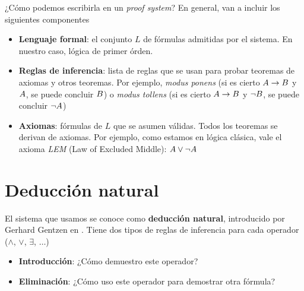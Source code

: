 ¿Cómo podemos escribirla en un \textit{proof system}? En general, van a incluir
los siguientes componentes

\begin{itemize}
    \item \textbf{Lenguaje formal}: el conjunto $L$ de fórmulas admitidas por
    el sistema. En nuestro caso, lógica de primer órden.
    \item \textbf{Reglas de inferencia}: lista de reglas que se usan para probar
    teoremas de axiomas y otros teoremas. Por ejemplo, \textit{modus ponens} (si
    es cierto $A \rightarrow B$ y $A$, se puede concluir $B$) o
    \textit{modus tollens} (si es cierto $A \rightarrow B$ y $\neg
    B$, se puede concluir $\neg A$)
    \item \textbf{Axiomas}: fórmulas de $L$ que se asumen válidas. Todos los
    teoremas se derivan de axiomas. Por ejemplo, como estamos en lógica clásica,
    vale el axioma \textit{LEM} (Law of Excluded Middle): $A \vee \neg A$
\end{itemize}

\section{Deducción natural}

El sistema que usamos se conoce como \textbf{deducción natural}, introducido por
Gerhard Gentzen en \cite{gentzen-1935} . Tiene dos tipos de
reglas de inferencia para cada operador ($\wedge$, $\vee$, $\exists$, $\dots$)

\begin{itemize}
    \item \textbf{Introducción}: ¿Cómo demuestro este operador?
    \item \textbf{Eliminación}: ¿Cómo uso este operador para demostrar otra fórmula?
\end{itemize}

\newcommand{\reprueba}{X}
\newcommand{\recursa}{R}
\newcommand{\falta}{F}

